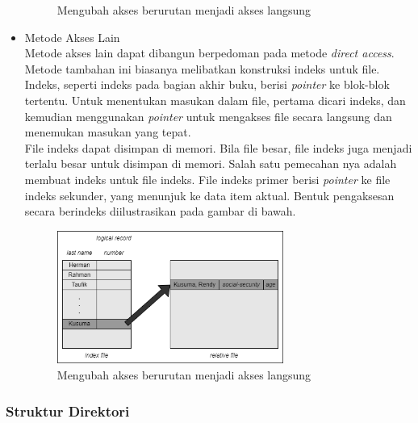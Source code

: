 \documentclass[12pt]{article}
\begin{document}
\begin{itemize}
\begin{figure}[h]
            \caption{Mengubah akses berurutan menjadi akses langsung}
        \end{figure}
    \item  Metode Akses Lain
        \\Metode akses lain dapat dibangun berpedoman pada metode \textit{direct access}. Metode tambahan ini biasanya melibatkan konstruksi indeks untuk file. Indeks, seperti indeks pada bagian akhir buku, berisi \textit{pointer} ke blok-blok tertentu. Untuk menentukan masukan dalam file, pertama dicari indeks, dan kemudian menggunakan \textit{pointer} untuk mengakses file secara langsung dan menemukan masukan yang tepat.
        \\File indeks dapat disimpan di memori. Bila file besar, file indeks juga menjadi terlalu besar untuk disimpan di memori. Salah satu pemecahan nya adalah membuat indeks untuk file indeks. File indeks primer berisi \textit{pointer} ke file indeks sekunder, yang menunjuk ke data item aktual. Bentuk pengaksesan secara berindeks diilustrasikan pada gambar di bawah.
        \begin{figure}[h]
			\centering
			\includegraphics[width=0.7\textwidth]{asset/gambar5.png}
            \caption{Mengubah akses berurutan menjadi akses langsung}
        \end{figure}
    \end{itemize}
    \subsubsection{Struktur Direktori}
\end{document}

